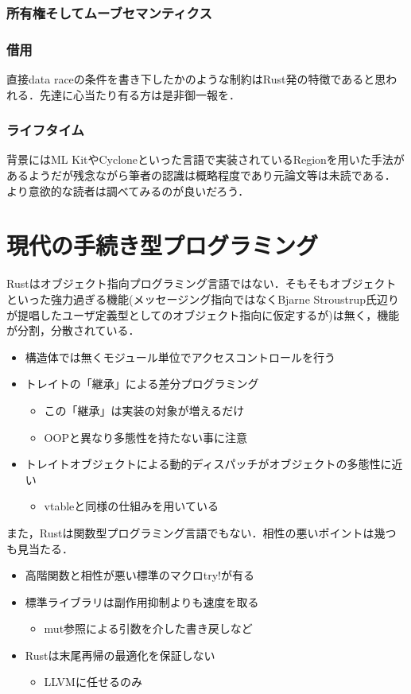 \subsubsection{所有権そしてムーブセマンティクス}

\subsubsection{借用}
直接data raceの条件を書き下したかのような制約はRust発の特徴であると思われる．先達に心当たり有る方は是非御一報を．

\subsubsection{ライフタイム}
背景にはML KitやCycloneといった言語で実装されているRegionを用いた手法があるようだが残念ながら筆者の認識は概略程度であり元論文等は未読である．
より意欲的な読者は調べてみるのが良いだろう．


\section{現代の手続き型プログラミング}
Rustはオブジェクト指向プログラミング言語ではない．そもそもオブジェクトといった強力過ぎる機能(メッセージング指向ではなくBjarne Stroustrup氏辺りが提唱したユーザ定義型としてのオブジェクト指向に仮定するが)は無く，機能が分割，分散されている．
\begin{itemize}
\item 構造体では無くモジュール単位でアクセスコントロールを行う
\item トレイトの「継承」による差分プログラミング
  \begin{itemize}
  \item この「継承」は実装の対象が増えるだけ
  \item OOPと異なり多態性を持たない事に注意
  \end{itemize}
\item トレイトオブジェクトによる動的ディスパッチがオブジェクトの多態性に近い
  \begin{itemize}
  \item vtableと同様の仕組みを用いている
  \end{itemize}
\end{itemize}
また，Rustは関数型プログラミング言語でもない．相性の悪いポイントは幾つも見当たる．
\begin{itemize}
\item 高階関数と相性が悪い標準のマクロtry!が有る
\item 標準ライブラリは副作用抑制よりも速度を取る
  \begin{itemize}
  \item mut参照による引数を介した書き戻しなど
  \end{itemize}
\item Rustは末尾再帰の最適化を保証しない
  \begin{itemize}
  \item LLVMに任せるのみ
  \end{itemize}
\end{itemize}

